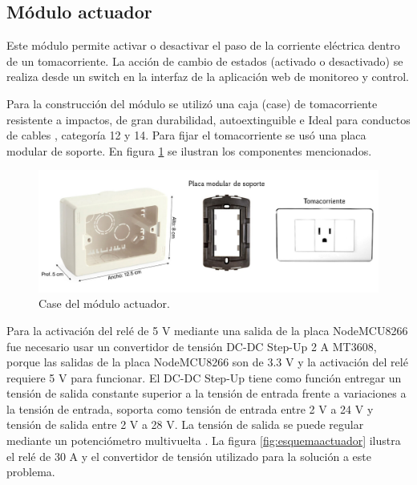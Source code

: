 \subsection{Módulo actuador}

Este módulo permite activar o desactivar el paso de la corriente eléctrica dentro de un tomacorriente. La acción de cambio de estados (activado o desactivado) se realiza desde un switch en la interfaz de la aplicación web de monitoreo y control.

Para la construcción del módulo se utilizó una caja (case) de tomacorriente  resistente a impactos, de gran durabilidad, autoextinguible e Ideal para conductos de cables \citep{WEBSITE:18}, categoría 12 y 14. Para fijar el tomacorriente se usó una placa modular de soporte. En figura \ref{fig:caseactuador} se ilustran los componentes mencionados.

\begin{figure}[htpb]
\centering 
\includegraphics[width=1.0\textwidth]{./Figures/actuador.jpg}
\caption{Case del módulo actuador.}
\label{fig:caseactuador}
\end{figure}

Para la activación del relé de 5 V mediante una salida de la placa NodeMCU8266 fue necesario usar un convertidor de tensión DC-DC Step-Up 2 A MT3608, porque las salidas de la placa NodeMCU8266 son de 3.3 V y la activación del relé requiere 5 V para funcionar. El DC-DC Step-Up tiene como función entregar un tensión de salida constante superior a la tensión de entrada frente a variaciones a la tensión de entrada, soporta como tensión de entrada entre 2 V a 24 V y tensión de salida entre 2 V a 28 V. La tensión de salida se puede regular mediante un potenciómetro multivuelta \citep{WEBSITE:19}. La figura \ref{fig:esquemaactuador} ilustra el relé de 30 A y el convertidor de tensión utilizado para la solución a este problema.


